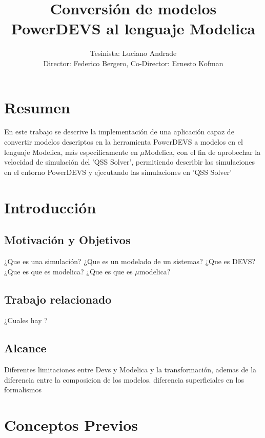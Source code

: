 \documentclass[a4paper,	11pt]{article}
\begin{document}
\renewcommand\floatpagefraction{.9}
\renewcommand\topfraction{.9}
\renewcommand\bottomfraction{.9}
\renewcommand\textfraction{.1}
\setcounter{totalnumber}{50}
\setcounter{topnumber}{50}
\setcounter{bottomnumber}{50}

\title{Conversión de modelos PowerDEVS al lenguaje Modelica}
\author{Tesinista: Luciano Andrade \\ Director: Federico Bergero, Co-Director: Ernesto Kofman} 

\maketitle
\section{Resumen}
En este trabajo se descrive la implementación de una aplicación capaz de convertir modelos descriptos en la herramienta PowerDEVS a modelos en el lenguaje Modelica, más especificamente en $\mu$Modelica, con el fin de aprobechar la velocidad de simulación del 'QSS Solver', permitiendo describir las simulaciones en el entorno PowerDEVS y ejecutando las simulaciones en 'QSS Solver'


\section{Introducción}
\subsection{Motivación y Objetivos}
¿Que es una simulación?
¿Que es un modelado de un sistemas?
¿Que es DEVS?
¿Que es que es modelica?
¿Que es que es $\mu$modelica?

\subsection{Trabajo relacionado}
¿Cuales hay ?
\subsection{Alcance}
 Diferentes limitaciones entre Devs y Modelica y la transformación, ademas de la diferencia entre la composicion de los modelos.
 diferencia superficiales en los formalismos

\section{Conceptos Previos}
\end{document}

